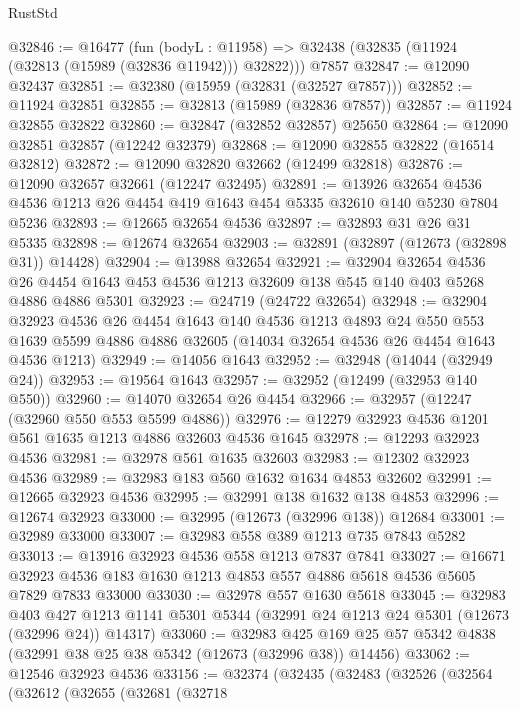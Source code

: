 \begin{lexlean}{RustStd}
\begin{coremodule}
@32846 := @16477
    (fun (bodyL : @11958) => @32438 (@32835 (@11924 (@32813 (@15989 (@32836 @11942))) @32822)))
    @7857
@32847 := @12090 @32437
@32851 := @32380 (@15959 (@32831 (@32527 @7857)))
@32852 := @11924 @32851
@32855 := @32813 (@15989 (@32836 @7857))
@32857 := @11924 @32855 @32822
@32860 := @32847 (@32852 @32857) @25650
@32864 := @12090 @32851 @32857 (@12242 @32379)
@32868 := @12090 @32855 @32822 (@16514 @32812)
@32872 := @12090 @32820 @32662 (@12499 @32818)
@32876 := @12090 @32657 @32661 (@12247 @32495)
@32891 := @13926
    @32654
    @4536
    @4536
    @1213
    @26
    @4454
    @419
    @1643
    @454
    @5335
    @32610
    @140
    @5230
    @7804
    @5236
@32893 := @12665 @32654 @4536
@32897 := @32893 @31 @26 @31 @5335
@32898 := @12674 @32654
@32903 := @32891 (@32897 (@12673 (@32898 @31)) @14428)
@32904 := @13988 @32654
@32921 := @32904
    @32654
    @4536
    @26
    @4454
    @1643
    @453
    @4536
    @1213
    @32609
    @138
    @545
    @140
    @403
    @5268
    @4886
    @4886
    @5301
@32923 := @24719 (@24722 @32654)
@32948 := @32904
    @32923
    @4536
    @26
    @4454
    @1643
    @140
    @4536
    @1213
    @4893
    @24
    @550
    @553
    @1639
    @5599
    @4886
    @4886
    @32605
    (@14034 @32654 @4536 @26 @4454 @1643 @4536 @1213)
@32949 := @14056 @1643
@32952 := @32948 (@14044 (@32949 @24))
@32953 := @19564 @1643
@32957 := @32952 (@12499 (@32953 @140 @550))
@32960 := @14070 @32654 @26 @4454
@32966 := @32957 (@12247 (@32960 @550 @553 @5599 @4886))
@32976 := @12279 @32923 @4536 @1201 @561 @1635 @1213 @4886 @32603 @4536 @1645
@32978 := @12293 @32923 @4536
@32981 := @32978 @561 @1635 @32603
@32983 := @12302 @32923 @4536
@32989 := @32983 @183 @560 @1632 @1634 @4853 @32602
@32991 := @12665 @32923 @4536
@32995 := @32991 @138 @1632 @138 @4853
@32996 := @12674 @32923
@33000 := @32995 (@12673 (@32996 @138)) @12684
@33001 := @32989 @33000
@33007 := @32983 @558 @389 @1213 @735 @7843 @5282
@33013 := @13916 @32923 @4536 @558 @1213 @7837 @7841
@33027 := @16671 @32923 @4536 @183 @1630 @1213 @4853 @557 @4886 @5618 @4536 @5605 @7829 @7833 @33000
@33030 := @32978 @557 @1630 @5618
@33045 := @32983
    @403
    @427
    @1213
    @1141
    @5301
    @5344
    (@32991 @24 @1213 @24 @5301 (@12673 (@32996 @24)) @14317)
@33060 := @32983
    @425
    @169
    @25
    @57
    @5342
    @4838
    (@32991 @38 @25 @38 @5342 (@12673 (@32996 @38)) @14456)
@33062 := @12546 @32923 @4536
@33156 := @32374
    (@32435
      (@32483
        (@32526
          (@32564
            (@32612
              (@32655
                (@32681
                  (@32718

\end{coremodule}
\end{lexlean}
